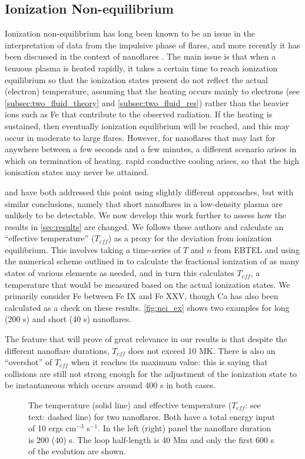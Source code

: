 \documentclass[apj]{emulateapj}
\begin{document}
	\subsection{Ionization Non-equilibrium}
	\label{subsec:nei_theory}
	\par Ionization non-equilibrium has long been known to be an issue in the interpretation of data from the impulsive phase of flares, and more recently it has been discussed in the context of nanoflares \citep{bradshaw_explosive_2006,reale_nonequilibrium_2008}. The main issue is that when a tenuous plasma is heated rapidly, it takes a certain time to reach ionization equilibrium so that the ionization states present do not reflect the actual (electron) temperature, assuming that the heating occurs mainly to electrons (see \autoref{subsec:two_fluid_theory} and \autoref{subsec:two_fluid_res}) rather than the heavier ions such as Fe that contribute to the observed radiation. If the heating is sustained, then eventually ionization equilibrium will be reached, and this may occur in moderate to large flares. However, for nanoflares that may last for anywhere between a few seconds and a few minutes, a different scenario arises in which on termination of heating, rapid conductive cooling arises, so that the high ionisation states may never be attained.
	\par \citet{reale_nonequilibrium_2008} and \citet{bradshaw_numerical_2009} have both addressed this point using slightly different approaches, but with similar conclusions, namely that short nanoflares in a low-density plasma are unlikely to be detectable. We now develop this work further to assess how the results in \autoref{sec:results} are changed. We follows these authors and calculate an ``effective temperature'' ($T_{eff}$) as a proxy for the deviation from ionization equilibrium. This involves taking a time-series of $T$ and $n$ from EBTEL and using the numerical scheme outlined in \citet{bradshaw_numerical_2009} to calculate the fractional ionization of as many states of various elements as needed, and in turn this calculates $T_{eff}$, a temperature that would be measured based on the actual ionization states. We primarily consider Fe between Fe IX and Fe XXV, though Ca has also been calculated as a check on these results. \autoref{fig:nei_ex} shows two examples for long (200 s) and short (40 s) nanoflares.
	\par The feature that will prove of great relevance in our results is that despite the different nanoflare durations, $T_{eff}$ does not exceed 10 MK. There is also an ``overshot'' of $T_{eff}$ when it reaches its maximum value: this is saying that collisions are still not strong enough for the adjustment of the ionization state to be instantaneous which occurs around 400 s in both cases.
	\begin{figure}
		\centering
		\caption{The temperature (solid line) and effective temperature ($T_{eff}$: see text: dashed line) for two nanoflares. Both have a total energy input of 10 ergs cm$^{-3}$ s$^{-1}$. In the left (right) panel the nanoflare duration is 200 (40) s. The loop half-length is 40 Mm and only the first 600 s of the evolution are shown.}
		\label{fig:nei_ex}
	\end{figure}
\end{document}
